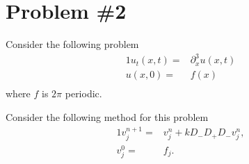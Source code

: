 \documentclass[11pt]{amsart}
\numberwithin{equation}{section}
\begin{document}
\newpage
\section{Problem \#2}

Consider the following problem
\begin{alignat*}{1}
    u_t(x,t)= & \partial_x^{3} u(x,t) \\
    u(x,0)=   & f(x)                  \\
\end{alignat*}
where $f$ is  $2 \pi$ periodic.


Consider the following method for this problem
\begin{alignat*}{1}
    v_j^{n+1} = & v_j^n + k  D_- D_+ D_- v_j^n, \\
    v_j^0=      & f_j.  
\end{alignat*}
\end{document}
